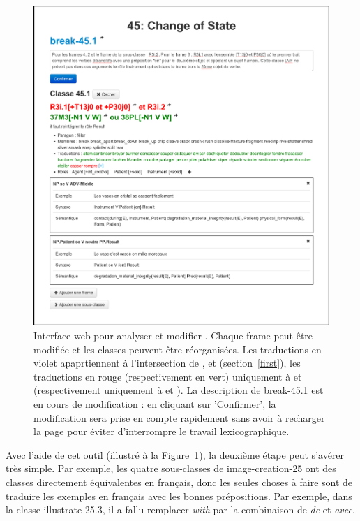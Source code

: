 \begin{figure}

    \includegraphics[width=\textwidth]{fig/tool_screenshot_2014-09-12.png}

    \caption{\label{tool}Interface web pour analyser et modifier \verbenet{}.
        Chaque frame peut être modifiée et les classes peuvent être
        réorganisées. Les traductions en violet apaprtiennent à l'intersection
        de \Clvf{}, \Clg{} et \Ltrad{} (section~\ref{first}), les traductions
        en rouge (respectivement en vert) uniquement à \Clvf{} et \Ltrad
        (respectivement uniquement à \Clg{} et \Ltrad{}). La description de
        {\color{blue}break-45.1} est en cours de modification : en cliquant sur
        'Confirmer', la modification sera prise en compte rapidement sans avoir
    à recharger la page pour éviter d'interrompre le travail lexicographique.}

\end{figure}

Avec l'aide de cet outil (illustré à la Figure~\ref{tool}), la deuxième étape
peut s'avérer très simple. Par exemple, les quatre sous-classes de
{\color{blue}image-creation-25} ont des classes directement équivalentes en
français, donc les seules choses à faire sont de traduire les exemples en
français avec les bonnes prépositions. Par exemple, dans la classe
{\color{blue}illustrate-25.3}, il a fallu remplacer \emph{with} par la
combinaison de \emph{de} et \emph{avec}.

